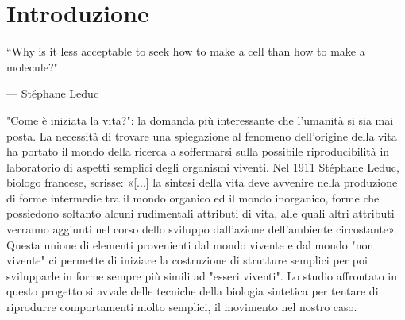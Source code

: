 \chapter{Introduzione}
\vspace{0.5cm}

\label{cha:intro}
\epigraph{“Why is it less acceptable to seek how to make a cell than how to make a molecule?"}{--- \textup{Stéphane Leduc}}

"Come è iniziata la vita?": la domanda più interessante che l'umanità si sia mai posta. La necessità di trovare una spiegazione al fenomeno dell'origine della vita ha portato il mondo della ricerca a soffermarsi sulla possibile riproducibilità in laboratorio di aspetti semplici degli organismi viventi. 
Nel 1911 Stéphane Leduc, biologo francese, scrisse: «[...] la sintesi della vita deve avvenire nella produzione di forme intermedie tra il mondo organico ed il mondo inorganico, forme che possiedono soltanto alcuni rudimentali attributi di vita, alle quali altri attributi verranno aggiunti nel corso dello sviluppo dall'azione dell'ambiente circostante». Questa unione di elementi provenienti dal mondo vivente e dal mondo "non vivente" ci permette di iniziare la costruzione di strutture semplici per poi svilupparle in forme sempre più simili ad "esseri viventi". 
Lo studio affrontato in questo progetto si avvale delle tecniche della biologia sintetica per tentare di riprodurre comportamenti molto semplici, il movimento nel nostro caso.

